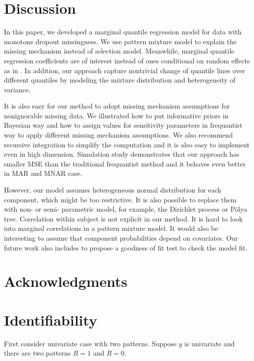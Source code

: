 \documentclass[12pt]{article}
\newcommand{\polya}{P\'{o}lya}
\begin{document}
\section{Discussion}
\label{sec:discussion}

In this paper, we developed a marginal quantile regression model for
data with monotone dropout missingness. We use pattern mixture model
to explain the missing mechanism instead of selection
model. Meanwhile, marginal quantile regression coefficients are of
interest instead of ones conditional on random effects as in
\citet{yuan2010}. In addition, our approach capture nontrivial change
of quantile lines over different quantiles by modeling the mixture
distribution and heterogeneity of variance.

It is also easy for our method to adopt missing mechanism assumptions
for nonignorable missing data. We illustrated how to put informative
priors in Bayesian way and how to assign values for sensitivity
parameters in frequantist way to apply different missing mechanism
assumptions.  We also recommend recursive integration to simplify the
computation and it is also easy to implement even in high dimension.
Simulation study demonstrates that our approach has smaller MSE than
the traditional frequantist method and it behaves even better in MAR
and MNAR case.

However, our model assumes heterogeneous normal distribution for each
component, which might be too restrictive. It is also possible to replace
them with non- or semi- parametric model, for example, the Dirichlet process
or \polya{} tree. Correlation within subject is not explicit in our
method. It is hard to look into marginal correlations in a pattern
mixture model. It would also be interesting to assume that component
probabilities depend on covariates. Our future work also includes to
propose a goodness of fit test to check the model fit.

\section{Acknowledgments}



% 




\appendix 
\section{Identifiability}
\label{sec:iden}
First consider univariate case with two patterns. Suppose $y$ is
univariate and there are two patterns $R = 1$ and $R = 0$.
\end{document}
